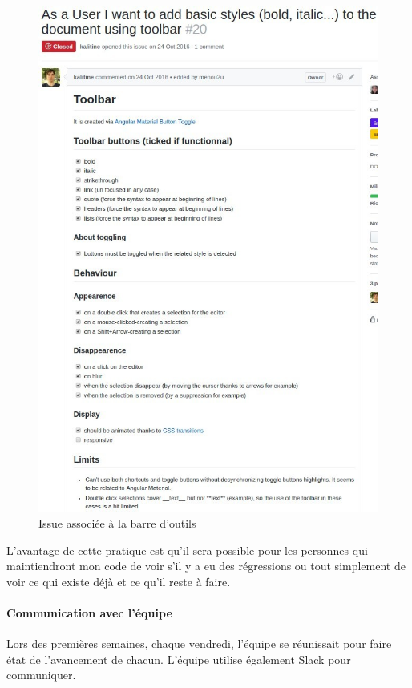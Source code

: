 \documentclass[12pt]{article}
\begin{document}
\newpage
\begin{figure}[H]
\centering
\includegraphics[scale=0.75]{gallery/issue.jpg}
\caption[nom dans le sommaire]{Issue associée à la barre d'outils}
\label{fig:gallery2}
\end{figure}
\newpage
L'avantage de cette pratique est qu'il sera possible pour les personnes qui maintiendront mon code de voir s'il y a eu des régressions ou tout simplement de voir ce qui existe déjà et ce qu'il reste à faire.\\

\paragraph{Communication avec l'équipe}
Lors des premières semaines, chaque vendredi, l'équipe se réunissait pour faire état de l'avancement de chacun.
L'équipe utilise également Slack \cite{slack} pour communiquer.\\
\end{document}
